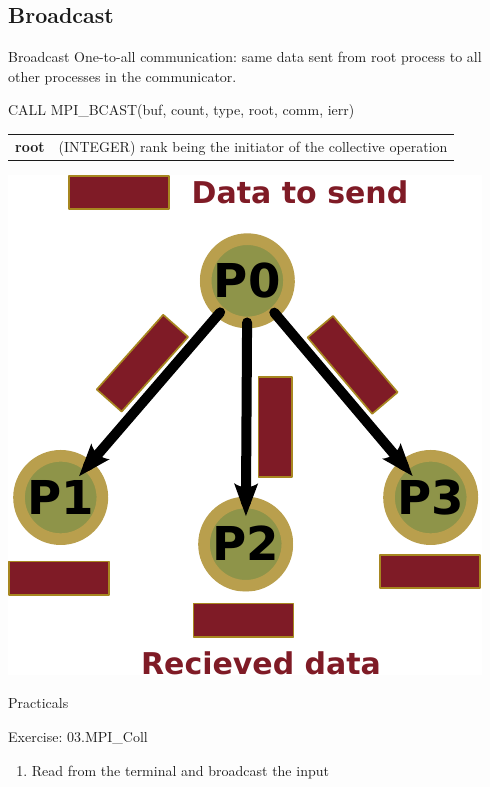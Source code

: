 \documentclass[aspectratio=43]{beamer}
\begin{document}
\subsection{Broadcast}
\begin{frame}[fragile]{Broadcast}
One-to-all communication: same data sent from root process to all other processes in the communicator.\\
\begin{Fortranlisting}[]{}
CALL MPI_BCAST(buf, count, type, root, comm, ierr)
\end{Fortranlisting}
\begin{black1block}{}
\begin{tabular}{rp{8cm}}
\textbf{root} & (INTEGER) rank being the initiator of the collective operation\\
\end{tabular}
\end{black1block}
\begin{center}
\includegraphics[scale=0.5]{03.MPI_Coll/broadcast.pdf}
\end{center}
\end{frame}

\begin{frame}{Practicals}
\begin{brown2block}{Exercise: 03.MPI\_Coll}
    \begin{enumerate}
        \item Read from the terminal and broadcast the input
    \end{enumerate}
    \end{brown2block}
\end{frame}
\end{document}
